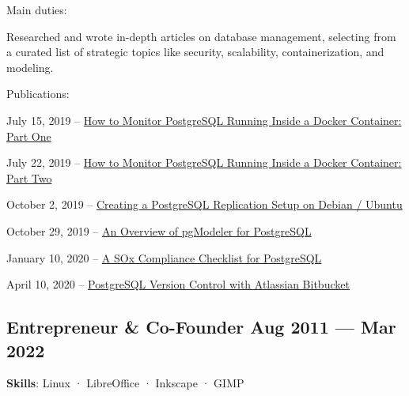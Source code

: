 \vspace{.3em}
Main duties:
\vspace{-.5em}
\begin{zitemize}
  \item
    Researched and wrote in-depth articles on database management, selecting from a curated list of strategic topics like security, scalability, containerization, and modeling.
\end{zitemize}

Publications:
\vspace{-.5em}
\begin{zitemize}
  \item
    {\small July 15, 2019} -- \href{\blog/how-monitor-postgresql-running-inside-docker-container-part-one}{How to Monitor PostgreSQL Running Inside a Docker Container: Part One}
  \item
    {\small July 22, 2019} -- \href{\blog/how-monitor-postgresql-running-inside-docker-container-part-two}{How to Monitor PostgreSQL Running Inside a Docker Container: Part Two}
  \item
    {\small October 2, 2019} -- \href{\blog/creating-postgresql-replication-setup-debian-ubuntu}{Creating a PostgreSQL Replication Setup on Debian / Ubuntu}
  \item
    {\small October 29, 2019} -- \href{\blog/overview-pgmodeler-postgresql}{An Overview of pgModeler for PostgreSQL}
  \item
    {\small January 10, 2020} -- \href{\blog/sox-compliance-checklist-postgresql}{A SOx Compliance Checklist for PostgreSQL}
  \item
    {\small April 10, 2020} -- \href{\blog/postgresql-version-control-atlassian-bitbucket}{PostgreSQL Version Control with Atlassian Bitbucket}
\end{zitemize}


\vspace{.5em}
\subsection{Entrepreneur \& Co-Founder \hfill Aug 2011 --- Mar 2022}
\vspace{.8em}
\textbf{Skills}: Linux · LibreOffice · Inkscape · GIMP


